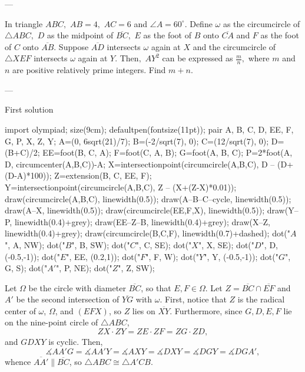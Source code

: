 
---

In triangle $ABC,$ $AB=4,$ $AC=6$ and $\angle A=60^\circ.$ Define $\omega$ as the circumcircle of $\triangle ABC,$ $D$ as the midpoint of $\overline{BC},$ $E$ as the foot of $B$ onto $\overline{CA}$ and $F$ as the foot of $C$ onto $\overline{AB}.$ Suppose $\overline{AD}$ intersects $\omega$ again at $X$ and the circumcircle of $\triangle XEF$ intersects $\omega$ again at $Y.$ Then$,$ $AY^2$ can be expressed as $\tfrac mn,$ where $m$ and $n$ are positive relatively prime integers$.$ Find $m+n.$

---

\begin{customenv}{First solution}\
    \begin{center}
        \begin{asy}
            import olympiad;
            size(9cm);
            defaultpen(fontsize(11pt));
            pair A, B, C, D, EE, F, G, P, X, Z, Y;
            A=(0, 6sqrt(21)/7);
            B=(-2/sqrt(7), 0);
            C=(12/sqrt(7), 0);
            D=(B+C)/2;
            EE=foot(B, C, A);
            F=foot(C, A, B);
            G=foot(A, B, C);
            P=2*foot(A, D, circumcenter(A,B,C))-A;
            X=intersectionpoint(circumcircle(A,B,C), D -- (D+(D-A)*100));
            Z=extension(B, C, EE, F);
            Y=intersectionpoint(circumcircle(A,B,C), Z -- (X+(Z-X)*0.01));
            draw(circumcircle(A,B,C), linewidth(0.5));
            draw(A--B--C--cycle, linewidth(0.5));
            draw(A--X, linewidth(0.5));
            draw(circumcircle(EE,F,X), linewidth(0.5));
            draw(Y--P, linewidth(0.4)+grey);
            draw(EE--Z--B, linewidth(0.4)+grey);
            draw(X--Z, linewidth(0.4)+grey);
            draw(circumcircle(B,C,F), linewidth(0.7)+dashed);
            dot("$A$", A, NW);
            dot("$B$", B, SW);
            dot("$C$", C, SE);
            dot("$X$", X, SE);
            dot("$D$", D, (-0.5,-1));
            dot("$E$", EE, (0.2,1));
            dot("$F$", F, W);
            dot("$Y$", Y, (-0.5,-1));
            dot("$G$", G, S);
            dot("$A'$", P, NE);
            dot("$Z$", Z, SW);
        \end{asy}
    \end{center}
    Let $\Omega$ be the circle with diameter $\overline{BC}$, so that $E,F\in\Omega$. Let $Z=\overline{BC}\cap\overline{EF}$ and $A'$ be the second intersection of $\overline{YG}$ with $\omega$. First, notice that $Z$ is the radical center of $\omega$, $\Omega$, and $(EFX)$, so $Z$ lies on $\overline{XY}$. Furthermore, since $G,D,E,F$ lie on the nine-point circle of $\triangle ABC$, \[ZX\cdot ZY=ZE\cdot ZF=ZG\cdot ZD,\]
    and $GDXY$ is cyclic. Then, \[\measuredangle AA'G=\measuredangle AA'Y=\measuredangle AXY=\measuredangle DXY=\measuredangle DGY=\measuredangle DGA',\]
    whence $\overline{AA'}\parallel\overline{BC}$, so $\triangle ABC\cong\triangle A'CB$.


\end{customenv}
